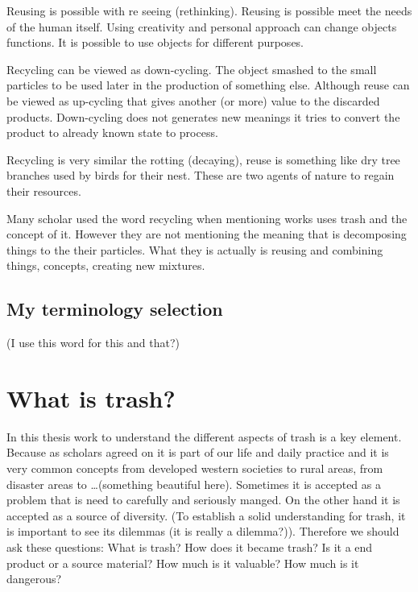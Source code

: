 Reusing is possible with re seeing (rethinking). Reusing is possible meet the needs of the human itself. Using creativity and personal approach can change objects functions. It is possible to use objects for different purposes. 

Recycling can be viewed as down-cycling. The object smashed to the small particles to be used later in the production of something else. Although reuse can be viewed as up-cycling that gives another (or more) value to the discarded products. Down-cycling does not generates new meanings it tries to convert the product to already known state to process. 

Recycling is very similar the rotting (decaying), reuse is something like dry tree branches used by birds for their nest. These are two agents of nature to regain their resources.

Many scholar used the word recycling when mentioning works uses trash and the concept of it. However they are not mentioning the meaning that is decomposing things to the their particles. What they is actually is reusing and combining things, concepts, creating new mixtures.

\subsection{My terminology selection}
(I use this word for this and that?)

\section{What is trash?}
In this thesis work to understand the different aspects of trash is a key element. Because as scholars agreed on it is part of our life and daily practice and it is very common concepts from developed western societies to rural areas, from disaster areas to \ldots(something beautiful here). Sometimes it is accepted as a problem that is need to carefully and seriously manged. On the other hand it is accepted as a source of diversity. (To establish a solid understanding for trash, it is important to see its dilemmas (it is really a dilemma?)). Therefore we should ask these questions: What is trash? How does it became trash? Is it a end product or a source material? How much is it valuable? How much is it dangerous?

